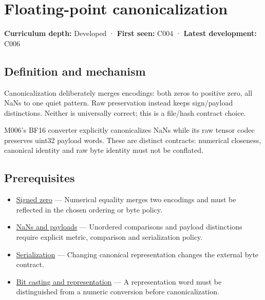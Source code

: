 \hypertarget{appendix-e90053a4b201}{}\label{referencestart:appendix-e90053a4b201}
\section{Floating-point canonicalization}\label{appendix-e90053a4b201-floating-point-canonicalization}

\hypertarget{appendix-e90053a4b201-floating-point-canonicalization}{}

\textbf{Curriculum depth:} Developed · \textbf{First seen:} C004 · \textbf{Latest development:} C006

\begin{allmightroledefinition}

\subsection{Definition and mechanism}\label{appendix-e90053a4b201-definition-and-mechanism}

\hypertarget{appendix-e90053a4b201-definition-and-mechanism}{}

Canonicalization deliberately merges encodings: both zeros to positive zero, all NaNs to one quiet pattern. Raw preservation instead keeps sign/payload distinctions. Neither is universally correct; this is a file/hash contract choice.

\end{allmightroledefinition}

M006's BF16 converter explicitly canonicalizes NaNs while its raw tensor codec preserves uint32 payload words. These are distinct contracts: numerical closeness, canonical identity and raw byte identity must not be conflated.

\subsection{Prerequisites}\label{appendix-e90053a4b201-prerequisites}

\hypertarget{appendix-e90053a4b201-prerequisites}{}

\begin{itemize}
\tightlist
\item
  \hyperref[appendix-3a048f032c1f]{Signed zero} --- Numerical equality merges two encodings and must be reflected in the chosen ordering or byte policy.
\item
  \hyperref[appendix-d6607cc4c235]{NaNs and payloads} --- Unordered comparisons and payload distinctions require explicit metric, comparison and serialization policy.
\item
  \hyperref[appendix-91d09ebed979]{Serialization} --- Changing canonical representation changes the external byte contract.
\item
  \hyperref[appendix-34ee45f161c1]{Bit casting and representation} --- A representation word must be distinguished from a numeric conversion before canonicalization.
\end{itemize}

